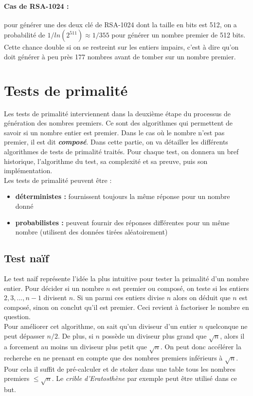 		\paragraph{Cas de RSA-1024 :} pour générer une des deux clé de RSA-1024 dont la taille en bits est 512, on a probabilité de $1/ln(2^{511}) \approx 1/355$ pour générer un nombre premier de 512 bits. Cette chance double si on se restreint sur les entiers impairs, c'est à dire qu'on doit générer à peu près 177 nombres avant de tomber sur un nombre premier.
		
	
	
	\section{Tests de primalité}
	
		Les tests de primalité interviennent dans la deuxième étape du processus de génération des nombres premiers. Ce sont des algorithmes qui permettent de savoir si un nombre entier est premier. Dans le cas où le nombre n'est pas premier, il est dit \textbf{\textit{composé}}. Dans cette partie, on va détailler les différents algorithmes de tests de primalité traités. Pour chaque test, on donnera un bref historique, l'algorithme du test, sa complexité et sa preuve, puis son implémentation.\\
		Les tests de primalité peuvent être :
		\begin{itemize}[leftmargin=*]
			\item \textbf{déterministes :} fournissent toujours la même réponse pour un nombre donné
			\item \textbf{probabilistes :} peuvent fournir des réponses différentes pour un même nombre (utilisent des données tirées aléatoirement)
		\end{itemize}
		
		
		\subsection{Test naïf}
			Le test naïf représente l'idée la plus intuitive pour tester la primalité d'un nombre entier. Pour décider si un nombre $n$ est premier ou composé, on teste si les entiers $2, 3, ..., n-1$ divisent $n$. Si un parmi ces entiers divise $n$ alors on déduit que $n$ est composé, sinon on conclut qu'il est premier. Ceci revient à factoriser le nombre en question.\\
			Pour améliorer cet algorithme, on sait qu'un diviseur d'un entier $n$ quelconque ne peut dépasser $n/2$. De plus, si $n$ possède un diviseur plus grand que $\sqrt{n}$, alors il a forcement au moins un diviseur plus petit que $\sqrt{n}$. On peut donc accélérer la recherche en ne prenant en compte que des nombres premiers inférieurs à $\sqrt{n}$. Pour cela il suffit de pré-calculer et de stoker dans une table tous les nombres premiers $\leqslant \sqrt{n}$. Le \textit{crible d'Eratosthène} par exemple peut être utilisé dans ce but.
		
